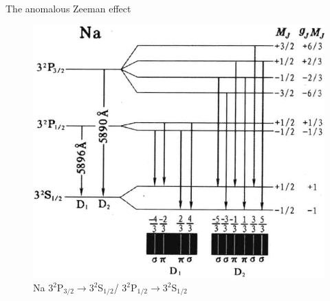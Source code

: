 \begin{frame}{The anomalous Zeeman effect}
    \begin{figure}
        \centering
        \includegraphics[scale=0.5]{fig/fig 5.15.png}
        \caption{Na $3^2$P$_{3/2}\to3^2$S$_{1/2}$/ $3^2$P$_{1/2}\to3^2$S$_{1/2}$}
    \end{figure}
\end{frame}